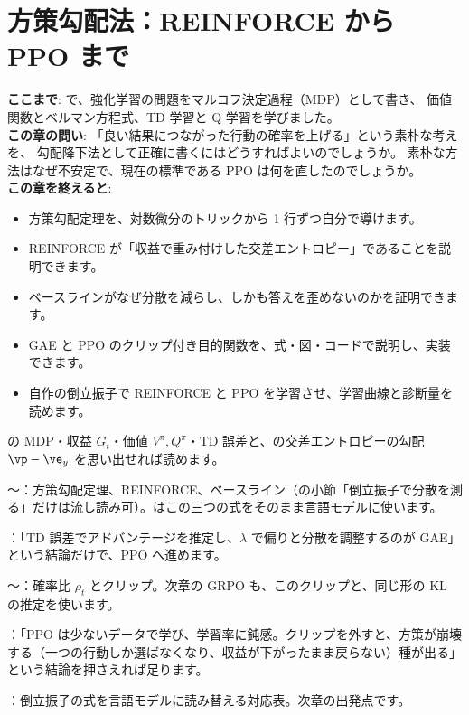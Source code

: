 \chapter{方策勾配法：REINFORCE から PPO まで}\label{ch:policy-gradient}
\begin{chapterlead}
\textbf{ここまで}: で、強化学習の問題をマルコフ決定過程（MDP）として書き、
価値関数とベルマン方程式、TD 学習と Q 学習を学びました。\\
\textbf{この章の問い}: 「良い結果につながった行動の確率を上げる」という素朴な考えを、
勾配降下法として正確に書くにはどうすればよいのでしょうか。
素朴な方法はなぜ不安定で、現在の標準である PPO は何を直したのでしょうか。\\
\textbf{この章を終えると}:
\begin{itemize}
\item 方策勾配定理を、対数微分のトリックから 1 行ずつ自分で導けます。
\item REINFORCE が「収益で重み付けした交差エントロピー」であることを説明できます。
\item ベースラインがなぜ分散を減らし、しかも答えを歪めないのかを証明できます。
\item GAE と PPO のクリップ付き目的関数を、式・図・コードで説明し、実装できます。
\item 自作の倒立振子で REINFORCE と PPO を学習させ、学習曲線と診断量を読めます。
\end{itemize}
\end{chapterlead}

\begin{readingguide}
\item[\rgpre] の MDP・収益 $G_t$・価値 $V^\pi,Q^\pi$・TD 誤差と、の交差エントロピーの勾配 $\vp-\ve_y$ を思い出せれば読めます。
\item[\rgmust] 〜：方策勾配定理、REINFORCE、ベースライン（の小節「倒立振子で分散を測る」だけは流し読み可）。はこの三つの式をそのまま言語モデルに使います。
\item[\rgskim] ：「TD 誤差でアドバンテージを推定し、$\lambda$ で偏りと分散を調整するのが GAE」という結論だけで、PPO へ進めます。
\item[\rgmust] 〜：確率比 $\rho_t$ とクリップ。次章の GRPO も、このクリップと、同じ形の KL の推定を使います。
\item[\rgskim] ：「PPO は少ないデータで学び、学習率に鈍感。クリップを外すと、方策が崩壊する（一つの行動しか選ばなくなり、収益が下がったまま戻らない）種が出る」という結論を押さえれば足ります。
\item[\rgmust] ：倒立振子の式を言語モデルに読み替える対応表。次章の出発点です。
\end{readingguide}

